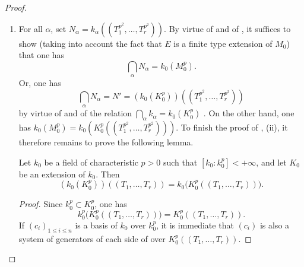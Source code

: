 \begin{proof}
\begin{enumerate}
  Applying  twice more to the first term on the right gives
  \[
    d(E/L_0,M/k_0)=d(E/L_0,M/N)+d(E/L_0,N/k)+d(E/L_0,k/k_0).
  \]
  Since $M\subset N(L_0^p)$, one has $d(E/L_0,M/N)=0$ ; hence, by ,
  \[
    \delta=d(E/L_0,k/k_0)+d(E/M_0,N/k).
  \]
  But $M_0$ and $L_0$ are separable extensions of $K_0$ , so
  \[
    d(L_0/K_0,k/k_0)=d(M_0/K_0,k/k_0)=0
  \]
  by .
  Applying  twice more,
  one has
  \[
    d(E/L_0,k/k_0)=d(E/K_0,k/k_0)=d(E/M_0,k/k_0),
  \]
  and a final application of  gives
  \[
    \delta=d(E/M_0,N/k_0),
  \]
  which proves .

  Furthermore, when $k$ is replaced by an intermediate field $k'$ with $k_0\subset k'\subset k$, $N$ is replaced by a subextension $N'$, and therefore $d(E/M_0,N'/k_0)\leqslant d(E/M_0,N/k_0)$ .
  This proves the last assertion of (i).

  \item[(ii)] For all $\alpha$, set $N_\alpha=k_\alpha((T_1^{p^2},\ldots,T_r^{p^2}))$.
  By virtue of  and of , it suffices to show (taking into account the fact that $E$ is a finite type extension of $M_0$) that one has
  \[
    \bigcap_\alpha N_\alpha=k_0(M_0^p).
  \]
  Or, one has
  \begin{equation}
  \tag{21.9.6.6}
  \label{0.21.9.6.6}
    \bigcap_\alpha N_\alpha=N'=(k_0(K_0^p))((T_1^{p^2},\ldots,T_r^{p^2}))
  \end{equation}
  by virtue of  and of the relation $\bigcap_\alpha k_\alpha=k_0(K_0^p)$ .
  On the other hand, one has $k_0(M_0^p)=k_0(K_0^p((T_1^{p^2},\ldots,T_r^{p^2})))$.
  To finish the proof of , (ii), it therefore remains to prove the following lemma.

  \begin{lemma}[21.9.6.7]
  \label{0.21.9.6.7}
  Let $k_0$ be a field of characteristic $p>0$ such that $[k_0:k_0^p]<+\infty$, and let $K_0$ be an extension of $k_0$.
  Then
  \begin{equation}
  \tag{21.9.6.8}
    \label{0.21.9.6.8}
    (k_0(K_0^p))((T_1,\ldots,T_r))=k_0\bigl(K_0^p((T_1,\ldots,T_r))\bigr).
  \end{equation}
  \end{lemma}

  \begin{proof}
  Since $k_0^p\subset K_0^p$, one has
  \[
    k_0^p\bigl(K_0^p((T_1,\ldots,T_r))\bigr)=K_0^p((T_1,\ldots,T_r)).
  \]
  If $(c_i)_{1\leqslant i\leqslant n}$ is a basis of $k_0$ over $k_0^p$, it is immediate that $(c_i)$ is also a system of generators of each side of  over $K_0^p((T_1,\ldots,T_r))$.
  \end{proof}
\end{enumerate}
\end{proof}

